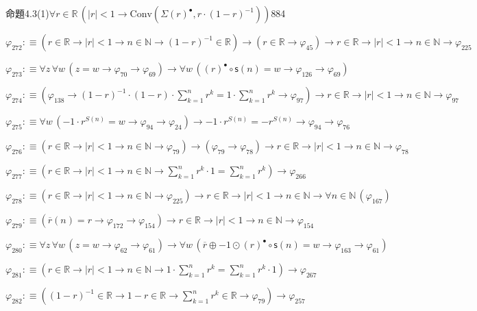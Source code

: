 \begin{fullproof}{命題4.3(1)}{$\forall r \in \mathbb{R}\,(\lvert r \rvert < 1 \to \mathrm{Conv}(\Sigma {(r)^{\bullet}},r \cdot (1 - r)^{-1}))$}{884}
\begin{abbrevlist}
\item $\varphi_{272} :\equiv (r \in \mathbb{R} \to \lvert r \rvert < 1 \to n \in \mathbb{N} \to (1 - r)^{-1} \in \mathbb{R}) \to (r \in \mathbb{R} \to \varphi_{45}) \to r \in \mathbb{R} \to \lvert r \rvert < 1 \to n \in \mathbb{N} \to \varphi_{225}$
\item $\varphi_{273} :\equiv \forall z\,\forall w\,(z = w \to \varphi_{70} \to \varphi_{69}) \to \forall w\,({(r)^{\bullet}} \circ \mathsf{s}(n) = w \to \varphi_{126} \to \varphi_{69})$
\item $\varphi_{274} :\equiv (\varphi_{138} \to (1 - r)^{-1} \cdot (1 - r) \cdot {\textstyle\sum_{k=1}^{n} {{r}^{k}}} = 1 \cdot {\textstyle\sum_{k=1}^{n} {{r}^{k}}} \to \varphi_{97}) \to r \in \mathbb{R} \to \lvert r \rvert < 1 \to n \in \mathbb{N} \to \varphi_{97}$
\item $\varphi_{275} :\equiv \forall w\,(-1 \cdot {{r}^{S(n)}} = w \to \varphi_{94} \to \varphi_{24}) \to -1 \cdot {{r}^{S(n)}} = -{{r}^{S(n)}} \to \varphi_{94} \to \varphi_{76}$
\item $\varphi_{276} :\equiv (r \in \mathbb{R} \to \lvert r \rvert < 1 \to n \in \mathbb{N} \to \varphi_{79}) \to (\varphi_{79} \to \varphi_{78}) \to r \in \mathbb{R} \to \lvert r \rvert < 1 \to n \in \mathbb{N} \to \varphi_{78}$
\item $\varphi_{277} :\equiv (r \in \mathbb{R} \to \lvert r \rvert < 1 \to n \in \mathbb{N} \to {\textstyle\sum_{k=1}^{n} {{r}^{k}}} \cdot 1 = {\textstyle\sum_{k=1}^{n} {{r}^{k}}}) \to \varphi_{266}$
\item $\varphi_{278} :\equiv (r \in \mathbb{R} \to \lvert r \rvert < 1 \to n \in \mathbb{N} \to \varphi_{225}) \to r \in \mathbb{R} \to \lvert r \rvert < 1 \to n \in \mathbb{N} \to \forall n \in \mathbb{N}\,(\varphi_{167})$
\item $\varphi_{279} :\equiv (\overline{r}(n) = r \to \varphi_{172} \to \varphi_{154}) \to r \in \mathbb{R} \to \lvert r \rvert < 1 \to n \in \mathbb{N} \to \varphi_{154}$
\item $\varphi_{280} :\equiv \forall z\,\forall w\,(z = w \to \varphi_{62} \to \varphi_{61}) \to \forall w\,(\overline{r} \oplus -1 \odot {(r)^{\bullet}} \circ \mathsf{s}(n) = w \to \varphi_{163} \to \varphi_{61})$
\item $\varphi_{281} :\equiv (r \in \mathbb{R} \to \lvert r \rvert < 1 \to n \in \mathbb{N} \to 1 \cdot {\textstyle\sum_{k=1}^{n} {{r}^{k}}} = {\textstyle\sum_{k=1}^{n} {{r}^{k}}} \cdot 1) \to \varphi_{267}$
\item $\varphi_{282} :\equiv ((1 - r)^{-1} \in \mathbb{R} \to 1 - r \in \mathbb{R} \to {\textstyle\sum_{k=1}^{n} {{r}^{k}}} \in \mathbb{R} \to \varphi_{79}) \to \varphi_{257}$

\end{abbrevlist}
\end{fullproof}

